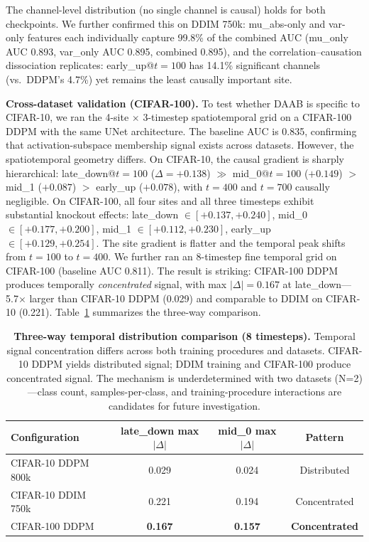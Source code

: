 \documentclass[10pt,conference]{IEEEtran}
\begin{document}
The channel-level distribution (no single channel is causal) holds for both
checkpoints. We further confirmed this on DDIM 750k: mu\_abs-only and var-only
features each individually capture 99.8\% of the combined AUC (mu\_only AUC
0.893, var\_only AUC 0.895, combined 0.895), and the correlation--causation
dissociation replicates: early\_up@$t{=}100$ has 14.1\% significant channels
(vs.\ DDPM's 4.7\%) yet remains the least causally important site.

\textbf{Cross-dataset validation (CIFAR-100).} To test whether DAAB is specific to
CIFAR-10, we ran the 4-site $\times$ 3-timestep spatiotemporal grid on a
CIFAR-100 DDPM with the same UNet architecture. The baseline AUC is 0.835,
confirming that activation-subspace membership signal exists across datasets.
However, the spatiotemporal geometry differs. On CIFAR-10, the causal gradient
is sharply hierarchical: late\_down@$t{=}100$ ($\Delta{=}{+}0.138$)
$\gg$ mid\_0@$t{=}100$ (${+}0.149$) $>$ mid\_1 (${+}0.087$) $>$ early\_up
(${+}0.078$), with $t{=}400$ and $t{=}700$ causally negligible. On CIFAR-100,
all four sites and all three timesteps exhibit substantial knockout effects:
late\_down ${\in}[{+}0.137,{+}0.240]$, mid\_0 ${\in}[{+}0.177,{+}0.200]$,
mid\_1 ${\in}[{+}0.112,{+}0.230]$, early\_up ${\in}[{+}0.129,{+}0.254]$.
The site gradient is flatter and the temporal peak shifts from $t{=}100$ to
$t{=}400$. We further ran an 8-timestep fine temporal grid on CIFAR-100
(baseline AUC 0.811). The result is striking: CIFAR-100 DDPM produces
temporally \emph{concentrated} signal, with max $|\Delta|{=}0.167$ at
late\_down---5.7$\times$ larger than CIFAR-10 DDPM (0.029) and comparable
to DDIM on CIFAR-10 (0.221). Table~\ref{tab:three-way-temporal} summarizes
the three-way comparison.

\begin{table}[t]
\centering
\caption{\textbf{Three-way temporal distribution comparison (8 timesteps).}
Temporal signal concentration differs across both training procedures and datasets.
CIFAR-10 DDPM yields distributed signal; DDIM training and CIFAR-100 produce
concentrated signal. The mechanism is underdetermined with two datasets
(N=2)---class count, samples-per-class, and training-procedure interactions
are candidates for future investigation.}
\label{tab:three-way-temporal}
\centering
\begin{tabular}{lccc}
\toprule
Configuration & late\_down max $|\Delta|$ & mid\_0 max $|\Delta|$ & Pattern \\
\midrule
CIFAR-10 DDPM 800k & 0.029 & 0.024 & Distributed \\
CIFAR-10 DDIM 750k & 0.221 & 0.194 & Concentrated \\
CIFAR-100 DDPM       & \textbf{0.167} & \textbf{0.157} & \textbf{Concentrated} \\
\bottomrule
\end{tabular}
\end{table}
\end{document}

